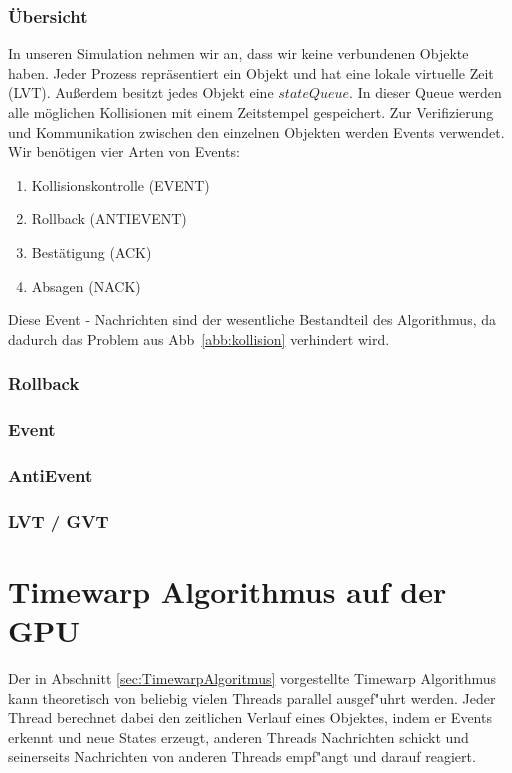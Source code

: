 \documentclass[a4paper, 10pt, openright, parskip, chapterprefix]{scrreprt}
\begin{document}
\subsection{Übersicht}
In unseren Simulation nehmen wir an, dass wir keine verbundenen Objekte haben. Jeder Prozess repräsentiert ein Objekt und hat eine lokale virtuelle Zeit (LVT). Außerdem besitzt jedes Objekt eine $stateQueue$. In dieser Queue werden alle möglichen Kollisionen mit einem Zeitstempel gespeichert. Zur Verifizierung und Kommunikation zwischen den einzelnen Objekten werden Events verwendet. Wir benötigen vier Arten von Events:
\begin{enumerate}
\item Kollisionskontrolle (EVENT)
\item Rollback (ANTIEVENT)
\item Bestätigung (ACK)
\item Absagen (NACK)
\end{enumerate}
Diese Event - Nachrichten sind der wesentliche Bestandteil des Algorithmus, da dadurch das Problem aus Abb~\ref{abb:kollision} verhindert wird.
\subsection{Rollback}
\subsection{Event}
\subsection{AntiEvent}
\subsection{LVT / GVT}





\chapter{Timewarp Algorithmus auf der GPU}
Der in Abschnitt \ref{sec:TimewarpAlgoritmus} vorgestellte Timewarp Algorithmus kann theoretisch von beliebig vielen Threads
parallel ausgef"uhrt werden. Jeder Thread berechnet dabei den zeitlichen Verlauf eines Objektes, indem er Events erkennt
und neue States erzeugt, anderen Threads Nachrichten schickt und seinerseits Nachrichten von anderen Threads empf"angt
und darauf reagiert. 
\end{document}
